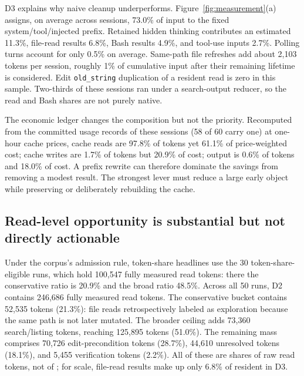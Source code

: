 \documentclass[10pt,twocolumn]{article}
\begin{document}
D3 explains why naive cleanup underperforms.  Figure~\ref{fig:measurement}(a) assigns, on average
across sessions, 73.0\% of input \tokensturns{} to the fixed system/tool/injected prefix.  Retained hidden
thinking contributes an estimated 11.3\%, file-read results 6.8\%, Bash results 4.9\%, and tool-use
inputs 2.7\%.  Polling turns account for only 0.5\% on average.  Same-path file refreshes add about
2,103 tokens per session, roughly 1\% of cumulative input after their remaining lifetime is considered.
Edit \texttt{old\_string} duplication of a resident read is zero in this sample.  Two-thirds of these
sessions ran under a search-output reducer, so the read and Bash shares are not purely native.

The economic ledger changes the composition but not the priority.  Recomputed from the committed usage
records of these sessions (58 of 60 carry one) at one-hour cache prices, cache reads are 97.8\% of
tokens yet 61.1\% of price-weighted cost; cache writes are 1.7\% of tokens but 20.9\% of cost; output is
0.6\% of tokens and 18.0\% of cost.  A prefix rewrite can therefore dominate the savings from removing a
modest result.  The strongest lever must reduce a large early object while preserving or deliberately
rebuilding the cache.


\subsection{Read-level opportunity is substantial but not directly actionable}

Under the corpus's admission rule, token-share headlines use the 30 token-share-eligible runs, which
hold 100,547 fully measured read tokens: there the conservative ratio is 20.9\% and the broad ratio
48.5\%.  Across all 50 runs, D2 contains 246,686 fully measured read tokens.  The conservative bucket
contains 52,535 tokens (21.3\%): file reads retrospectively labeled as exploration because the same
path is not later mutated.  The broader ceiling adds 73,360 search/listing tokens, reaching 125,895
tokens (51.0\%).  The remaining mass comprises 70,726 edit-precondition tokens (28.7\%), 44,610
unresolved tokens (18.1\%), and 5,455 verification tokens (2.2\%).  All of these are shares of raw read
tokens, not of \tokensturns; for scale, file-read results make up only 6.8\% of resident \tokensturns{}
in D3.
\end{document}
